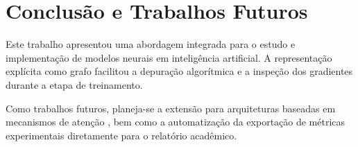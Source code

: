 ﻿\section{Conclusão e Trabalhos Futuros}
\label{sec:conclusao}

Este trabalho apresentou uma abordagem integrada para o estudo e implementação de modelos neurais em inteligência artificial. A representação explícita como grafo facilitou a depuração algorítmica e a inspeção dos gradientes durante a etapa de treinamento.

Como trabalhos futuros, planeja-se a extensão para arquiteturas baseadas em mecanismos de atenção \cite{vaswani2017attention}, bem como a automatização da exportação de métricas experimentais diretamente para o relatório acadêmico.
